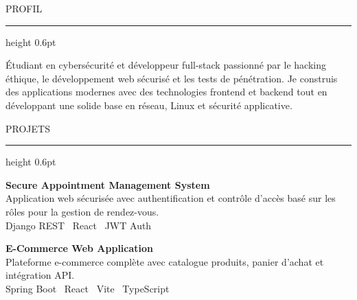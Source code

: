 \documentclass[10pt, a4paper]{article}
\newcommand{\mainheading}[1]{%
  \vspace{8pt}
  {\fontsize{7.5}{9}\selectfont\color{accent}\MakeUppercase{#1}}%
  \vspace{2pt}\newline
  {\color{rulecol}\hrule height 0.6pt}%
  \vspace{7pt}
}
\newcommand{\projecttitle}[1]{%
  {\fontsize{9}{11}\selectfont\bfseries\color{maintext} #1}%
}
\newcommand{\projdesc}[1]{%
  {\fontsize{8.5}{11}\selectfont\color{muted} #1}%
}
\begin{document}
\begin{minipage}[t]{0.67\textwidth}
\vspace{14pt}
\hspace*{4pt}
\begin{minipage}[t]{0.94\linewidth}

\mainheading{Profil}

{\fontsize{9}{14}\selectfont\color{muted}
Étudiant en cybersécurité et développeur full-stack passionné par le hacking éthique, le développement web sécurisé et les tests de pénétration. Je construis des applications modernes avec des technologies frontend et backend tout en développant une solide base en réseau, Linux et sécurité applicative.
}

\mainheading{Projets}

\hspace{6pt}%
\begin{minipage}[t]{0.93\linewidth}
\projecttitle{Secure Appointment Management System}\\
\projdesc{Application web sécurisée avec authentification et contrôle d'accès basé sur les rôles pour la gestion de rendez-vous.}\\[2pt]
{\fontsize{7.5}{9}\selectfont\color{accent} Django REST \textbullet\ React \textbullet\ JWT Auth}
\end{minipage}

\vspace{8pt}

\hspace{6pt}%
\begin{minipage}[t]{0.93\linewidth}
\projecttitle{E-Commerce Web Application}\\
\projdesc{Plateforme e-commerce complète avec catalogue produits, panier d'achat et intégration API.}\\[2pt]
{\fontsize{7.5}{9}\selectfont\color{accent} Spring Boot \textbullet\ React \textbullet\ Vite \textbullet\ TypeScript}
\end{minipage}

\vspace{8pt}


\end{minipage}
\end{minipage}
\end{document}
